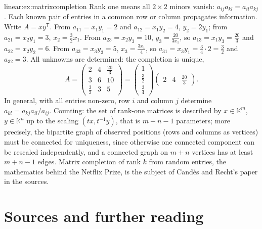 \begin{solution}{linear:ex:matrixcompletion}
\idea Rank one means all $2\times2$ minors vanish: $a_{ij}a_{kl}=a_{il}a_{kj}$. Each known pair of entries in a common row or
column propagates information.
\writeup Write $A=xy^{\mathsf T}$. From $a_{11}=x_1y_1=2$ and $a_{12}=x_1y_2=4$, $y_2=2y_1$; from $a_{21}=x_2y_1=3$,
$x_2=\frac32x_1$. From $a_{23}=x_2y_3=10$, $y_3=\frac{20}{3x_1}$, so $a_{13}=x_1y_3=\frac{20}3$ and $a_{22}=x_2y_2=6$. From
$a_{33}=x_3y_3=5$, $x_3=\frac{3x_1}4$, so $a_{31}=x_3y_1=\frac34\cdot2=\frac32$ and $a_{32}=3$. All unknowns are determined:
the completion is unique,
\[
A=\begin{pmatrix}2&4&\frac{20}3\\3&6&10\\\frac32&3&5\end{pmatrix}=\begin{pmatrix}1\\\frac32\\\frac34\end{pmatrix}\begin{pmatrix}2&4&\frac{20}3\end{pmatrix}.
\]
In general, with all entries non-zero, row $i$ and column $j$ determine $a_{kl}=a_{kj}a_{il}/a_{ij}$. Counting: the set of
rank-one matrices is described by $x\in\mathbb K^m$, $y\in\mathbb K^n$ up to the scaling $(tx,t^{-1}y)$, that is $m+n-1$
parameters; more precisely, the bipartite graph of observed positions (rows and columns as vertices) must be connected for
uniqueness, since otherwise one connected component can be rescaled independently, and a connected graph on $m+n$ vertices
has at least $m+n-1$ edges. Matrix completion of rank $k$ from random entries, the mathematics behind the Netflix Prize, is
the subject of Cand\`es and Recht's paper in the sources.
\end{solution}

\section*{Sources and further reading}


